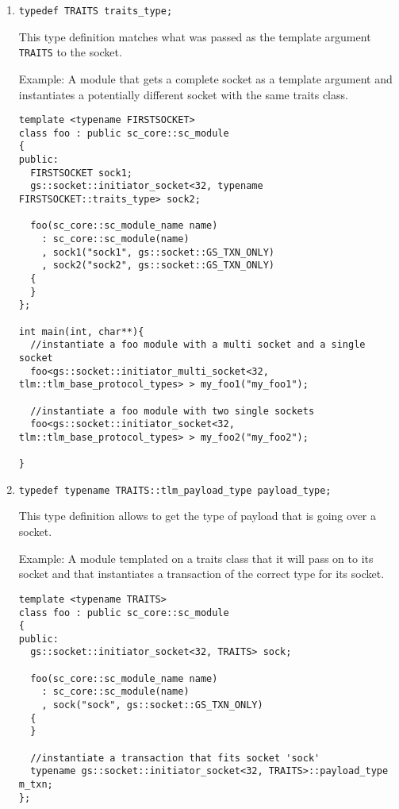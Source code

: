\documentclass[a4paper,10pt]{article}          %
\begin{document}
\begin{enumerate}
\item 
\verb|typedef TRAITS traits_type;|

This type definition matches what was passed as the template argument \verb|TRAITS| to the socket.

Example: A module that gets a complete socket as a template argument and instantiates a potentially different socket with the same traits class.

\begin{small}
\begin{verbatim}
template <typename FIRSTSOCKET>
class foo : public sc_core::sc_module
{
public:
  FIRSTSOCKET sock1;
  gs::socket::initiator_socket<32, typename FIRSTSOCKET::traits_type> sock2;

  foo(sc_core::sc_module_name name)
    : sc_core::sc_module(name)
    , sock1("sock1", gs::socket::GS_TXN_ONLY)
    , sock2("sock2", gs::socket::GS_TXN_ONLY)
  {
  }
};

int main(int, char**){
  //instantiate a foo module with a multi socket and a single socket
  foo<gs::socket::initiator_multi_socket<32, tlm::tlm_base_protocol_types> > my_foo1("my_foo1");
  
  //instantiate a foo module with two single sockets
  foo<gs::socket::initiator_socket<32, tlm::tlm_base_protocol_types> > my_foo2("my_foo2");

}
\end{verbatim}
\end{small}

\item
\verb|typedef typename TRAITS::tlm_payload_type payload_type;|

This type definition allows to get the type of payload that is going over a socket.

Example: A module templated on a traits class that it will pass on to its socket and that instantiates a transaction of the correct type for its socket.

\begin{small}
\begin{verbatim}
template <typename TRAITS>
class foo : public sc_core::sc_module
{
public:
  gs::socket::initiator_socket<32, TRAITS> sock;

  foo(sc_core::sc_module_name name)
    : sc_core::sc_module(name)
    , sock("sock", gs::socket::GS_TXN_ONLY)
  {
  }
  
  //instantiate a transaction that fits socket 'sock'
  typename gs::socket::initiator_socket<32, TRAITS>::payload_type m_txn;
};
\end{verbatim}
\end{small}


\end{enumerate}
\end{document}
